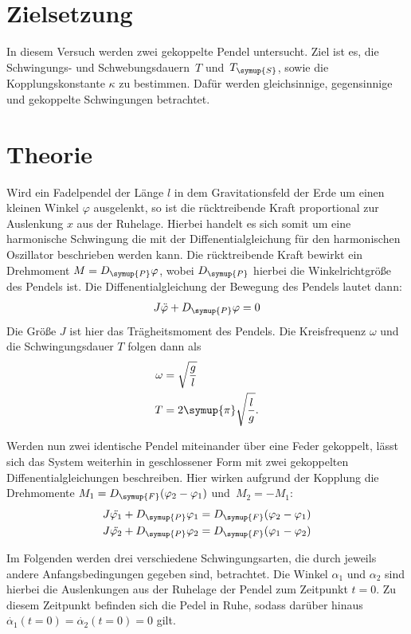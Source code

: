 \section{Zielsetzung}
\label{sec:Zielsetzung}
In diesem Versuch werden zwei gekoppelte Pendel untersucht. Ziel ist es, die Schwingungs- und Schwebungsdauern~$T$ und~$T_{\symup{S}}$, sowie die
Kopplungskonstante $\kappa$ zu bestimmen. Dafür werden gleichsinnige, gegensinnige und gekoppelte Schwingungen betrachtet.

\section{Theorie}
\label{sec:Theorie}
Wird ein Fadelpendel der Länge $l$ in dem Gravitationsfeld der Erde um einen kleinen Winkel $\varphi$ ausgelenkt, so ist die rücktreibende Kraft
proportional zur Auslenkung $x$ aus der Ruhelage. Hierbei handelt es sich somit um eine harmonische Schwingung die mit der Diffenentialgleichung für
den harmonischen Oszillator beschrieben werden kann. Die rücktreibende Kraft bewirkt ein Drehmoment $M=D_{\symup{P}}\varphi$, wobei $D_{\symup{P}}$
hierbei die Winkelrichtgröße des Pendels ist. Die Diffenentialgleichung der Bewegung des Pendels lautet dann:
\begin{align*}
    J\ddot{\varphi} + D_{\symup{P}}\varphi = 0
\end{align*}
Die Größe $J$ ist hier das Trägheitsmoment des Pendels.
Die Kreisfrequenz $\omega$ und die Schwingungsdauer $T$ folgen dann als
\begin{align}
    \omega &= \sqrt{\frac{g}{l}} \label{eq:Kreisfrequenz} \\
    T &= 2\symup{\pi}\sqrt{\frac{l}{g}}. \label{eq:Schwingungsdauer}
\end{align}

Werden nun zwei identische Pendel miteinander über eine Feder gekoppelt, lässt sich das System weiterhin in geschlossener Form mit zwei gekoppelten
Diffenentialgleichungen beschreiben. Hier wirken aufgrund der Kopplung die Drehmomente $M_1=D_{\symup{F}}(\varphi_2-\varphi_1)$ und~$M_2=-M_1$:
\begin{align*}
    J\ddot{\varphi_{1}} + D_{\symup{P}} \varphi_{1} &= D_{\symup{F}}(\varphi_2-\varphi_1) \\
    J\ddot{\varphi_{2}} + D_{\symup{P}} \varphi_{2} &= D_{\symup{F}}(\varphi_1-\varphi_2)
\end{align*}

Im Folgenden werden drei verschiedene Schwingungsarten, die durch jeweils andere Anfangsbedingungen gegeben sind, betrachtet. Die Winkel $\alpha_1$ 
und $\alpha_2$ sind hierbei die Auslenkungen aus der Ruhelage der Pendel zum Zeitpunkt $t=0$. Zu diesem Zeitpunkt befinden sich die Pedel in Ruhe, 
sodass darüber hinaus $\dot{\alpha_1}(t=0) = \dot{\alpha_2}(t=0) = 0$ gilt. \\


